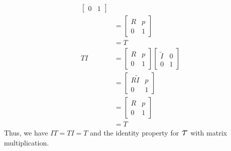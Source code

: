 \documentclass[11pt]{article}
\newcommand\Tau{\scalerel*{\tau}{T}}
\begin{document}
\begin{enumerate}[leftmargin=0.3in]
\begin{enumerate}
\begin{align*}
\begin{bmatrix}
                0 & 1
            \end{bmatrix} \\
            &= \begin{bmatrix}
                \mathit{R} & \mathit{p} \\
                0 & 1
            \end{bmatrix} \\
            &= \mathit{T} \\
           \mathit{T} \mathit{I} &= \begin{bmatrix}
               \mathit{R} & \mathit{p} \\
               0 & 1
               \end{bmatrix} \begin{bmatrix} 
               \tilde{\mathit{I}} & \mathit{0} \\
               0 & 1
           \end{bmatrix} \\
            &= \begin{bmatrix}
                \mathit{R} \tilde{\mathit{I}} & \mathit{p} \\
                0 & 1
            \end{bmatrix} \\
            &= \begin{bmatrix}
                \mathit{R} & \mathit{p} \\
                0 & 1
            \end{bmatrix} \\
            &= \mathit{T}
   \end{align*}
   Thus, we have $\mathit{I} \mathit{T} = \mathit{T} \mathit{I} = \mathit{T}$ and the identity property for $\Tau$ with matrix multiplication. \break


\end{enumerate}
\end{enumerate}
\end{document}
